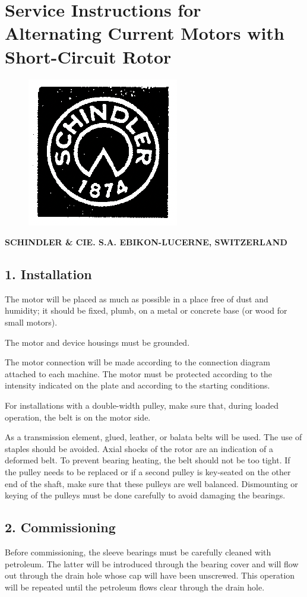 \chapter{Service Instructions for Alternating Current Motors with Short-Circuit Rotor}

\begin{figure}[ht]
    \centering
    \includegraphics[width=0.1\linewidth]{images/page_63_manufacturer_logo}
    \label{fig:schindler_manufacturer_logo}
\end{figure}

\begin{center}
    \textbf{\small SCHINDLER \& CIE. S.A. EBIKON-LUCERNE, SWITZERLAND}
\end{center}


\section*{1. Installation}

The motor will be placed as much as possible in a place free of dust and humidity;
it should be fixed, plumb, on a metal or concrete base (or wood for small motors).

The motor and device housings must be grounded.

The motor connection will be made according to the connection diagram attached to each machine.
The motor must be protected according to the intensity indicated on the plate and according to the starting conditions.

For installations with a double-width pulley, make sure that, during loaded operation, the belt is on the motor side.

As a transmission element, glued, leather, or balata belts will be used. The use of staples should be avoided.
Axial shocks of the rotor are an indication of a deformed belt. To prevent bearing heating, the belt should not be too tight.
If the pulley needs to be replaced or if a second pulley is key-seated on the other end of the shaft,
make sure that these pulleys are well balanced.
Dismounting or keying of the pulleys must be done carefully to avoid damaging the bearings.

\section*{2. Commissioning}

Before commissioning, the sleeve bearings must be carefully cleaned with petroleum.
The latter will be introduced through the bearing cover and will flow out through the drain hole whose cap will have been unscrewed.
This operation will be repeated until the petroleum flows clear through the drain hole.
